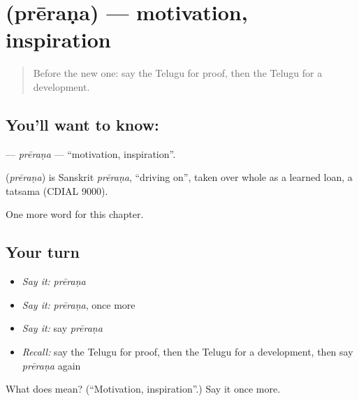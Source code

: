\section[\texorpdfstring{\te{ప్రేరణ} (prēraṇa)}{ప్రేరణ (prēraṇa)}]{ (prēraṇa) — motivation, inspiration}

\label{lesson:TE-C219-prerana}



\begin{quote}
Before the new one: say the Telugu for proof, then the Telugu for a development.
\end{quote}

\subsection*{You'll want to know: }
\textbf{} — \emph{prēraṇa} — \textquotedblleft{}motivation, inspiration\textquotedblright{}.

\begin{cousinweb}
\textbf{} (\emph{prēraṇa}) is Sanskrit \emph{prēraṇa}, \textquotedblleft{}driving on\textquotedblright{}, taken over whole as a learned loan, a tatsama (CDIAL 9000).
\end{cousinweb}

\begin{grammarlens}[title={What you've built}]
One more word for this chapter.
\end{grammarlens}

\subsection*{Your turn}
\begin{itemize}
\raggedright
  \item \emph{Say it:} \emph{prēraṇa}
  \item \emph{Say it:} \emph{prēraṇa}, once more
  \item \emph{Say it:} say \emph{prēraṇa}
  \item \emph{Recall:} say the Telugu for proof, then the Telugu for a development, then say \emph{prēraṇa} again
\end{itemize}

\begin{tcolorbox}[breakable,colback=teal!4,colframe=teal!35!black,title={Before you move on}]
What does  mean? (\textquotedblleft{}Motivation, inspiration\textquotedblright{}.) Say it once more.
\end{tcolorbox}
